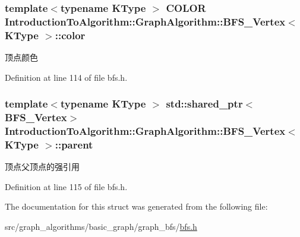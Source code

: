 \subsubsection[{color}]{\setlength{\rightskip}{0pt plus 5cm}template$<$typename K\+Type $>$ {\bf C\+O\+L\+O\+R} {\bf Introduction\+To\+Algorithm\+::\+Graph\+Algorithm\+::\+B\+F\+S\+\_\+\+Vertex}$<$ K\+Type $>$\+::color}\label{struct_introduction_to_algorithm_1_1_graph_algorithm_1_1_b_f_s___vertex_a7ab527ab8514bcb65e56edbe62b28fbb}
顶点颜色 

Definition at line 114 of file bfs.\+h.

\hypertarget{struct_introduction_to_algorithm_1_1_graph_algorithm_1_1_b_f_s___vertex_a11202710469656d7fb04635430355c41}{}
\subsubsection[{parent}]{\setlength{\rightskip}{0pt plus 5cm}template$<$typename K\+Type $>$ std\+::shared\+\_\+ptr$<${\bf B\+F\+S\+\_\+\+Vertex}$>$ {\bf Introduction\+To\+Algorithm\+::\+Graph\+Algorithm\+::\+B\+F\+S\+\_\+\+Vertex}$<$ K\+Type $>$\+::parent}\label{struct_introduction_to_algorithm_1_1_graph_algorithm_1_1_b_f_s___vertex_a11202710469656d7fb04635430355c41}
顶点父顶点的强引用 

Definition at line 115 of file bfs.\+h.



The documentation for this struct was generated from the following file\+:\begin{DoxyCompactItemize}
\item 
src/graph\+\_\+algorithms/basic\+\_\+graph/graph\+\_\+bfs/\hyperlink{bfs_8h}{bfs.\+h}\end{DoxyCompactItemize}
